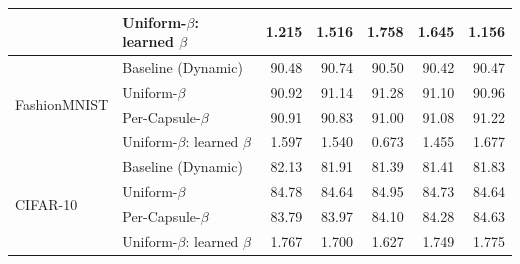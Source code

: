 \begin{table}[!htbp]
\begin{tabular}{@{}llrrrrr@{}}
         & Uniform-$\beta$: learned $\beta$ & 1.215 & 1.516 & 1.758 & 1.645 & 1.156 \\
        \midrule
        \multirow{4}{*}{FashionMNIST} & Baseline (Dynamic) & 90.48 & 90.74 & 90.50 & 90.42 & 90.47 \\
         & Uniform-$\beta$ & 90.92 & 91.14 & 91.28 & 91.10 & 90.96 \\
         & Per-Capsule-$\beta$ & 90.91 & 90.83 & 91.00 & 91.08 & 91.22 \\
         & Uniform-$\beta$: learned $\beta$ & 1.597 & 1.540 & 0.673 & 1.455 & 1.677 \\
        \midrule
        \multirow{4}{*}{CIFAR-10} & Baseline (Dynamic) & 82.13 & 81.91 & 81.39 & 81.41 & 81.83 \\
         & Uniform-$\beta$ & 84.78 & 84.64 & 84.95 & 84.73 & 84.64 \\
         & Per-Capsule-$\beta$ & 83.79 & 83.97 & 84.10 & 84.28 & 84.63 \\
         & Uniform-$\beta$: learned $\beta$ & 1.767 & 1.700 & 1.627 & 1.749 & 1.775 \\
        \bottomrule
    \end{tabular}


\end{table}
